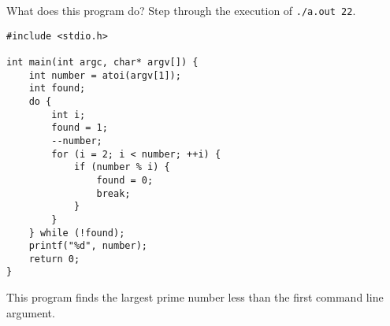 What does this program do? Step through the execution of \texttt{./a.out 22}.

\begin{verbatim}
#include <stdio.h>

int main(int argc, char* argv[]) {
    int number = atoi(argv[1]);
    int found;
    do {
        int i;
        found = 1;
        --number;
        for (i = 2; i < number; ++i) {
            if (number % i) {
                found = 0;
                break;
            }
        }
    } while (!found);
    printf("%d", number);
    return 0;
}
\end{verbatim}


\begin{answer}
This program finds the largest prime number less than the first command line argument.
\end{answer}